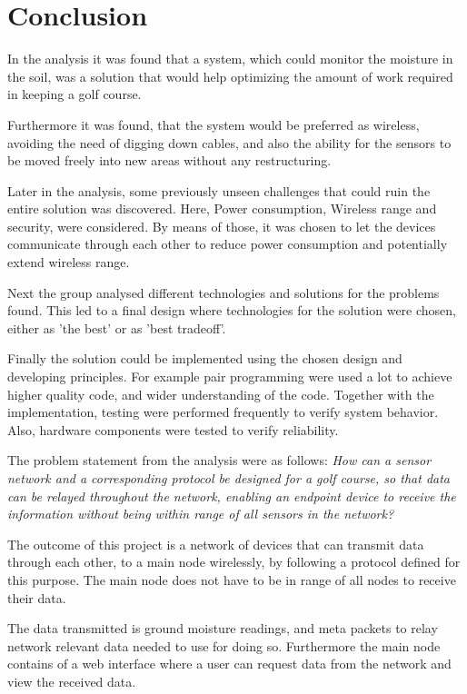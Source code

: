 \section{Conclusion}
In the analysis it was found that a system, which could monitor the moisture in the soil, was a solution that would help optimizing the amount of work required in keeping a golf course.

Furthermore it was found, that the system would be preferred as wireless, avoiding the need of digging down cables, and also the ability for the sensors to be moved freely into new areas without any restructuring.

Later in the analysis, some previously unseen challenges that could ruin the entire solution was discovered. Here, Power consumption, Wireless range and security, were considered. By means of those, it was chosen to let the devices communicate through each other to reduce power consumption and potentially extend wireless range.

Next the group analysed different technologies and solutions for the problems found. This led to a final design where technologies for the solution were chosen, either as 'the best' or as 'best tradeoff'.

Finally the solution could be implemented using the chosen design and developing principles. For example pair programming were used a lot to achieve higher quality code, and wider understanding of the code. Together with the implementation, testing were performed frequently to verify system behavior. Also, hardware components were tested to verify reliability.

The problem statement from the analysis were as follows:
\textit{How can a sensor network and a corresponding protocol be designed for a golf course, so that data can be relayed throughout the network, enabling an endpoint device to receive the information without being within range of all sensors in the network?}

The outcome of this project is a network of devices that can transmit data through each other, to a main node wirelessly, by following a protocol defined for this purpose. The main node does not have to be in range of all nodes to receive their data.

The data transmitted is ground moisture readings, and meta packets to relay network relevant data needed to use for doing so. Furthermore the main node contains of a web interface where a user can request data from the network and view the received data.

